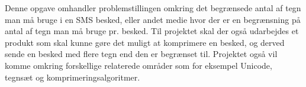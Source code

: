 Denne opgave omhandler problemstillingen omkring det begrænsede antal af tegn man må bruge i en SMS besked, eller andet medie hvor der er en begrænsning på antal af tegn man må bruge pr. besked. Til projektet skal der også udarbejdes et produkt som skal kunne gøre det muligt at komprimere en besked, og derved sende en besked med flere tegn end den er begrænset til. Projektet også vil komme omkring forskellige relaterede områder som for eksempel Unicode, tegnsæt og komprimeringsalgoritmer.
